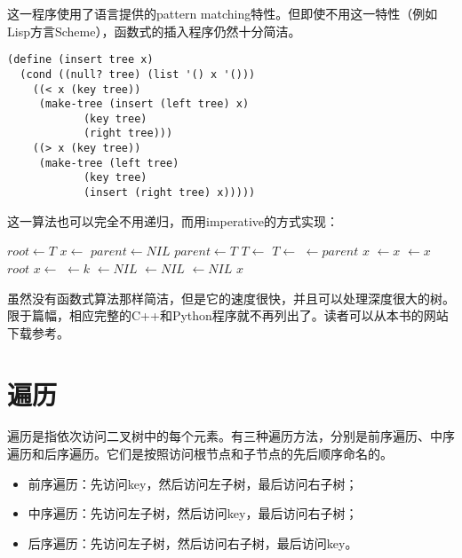 \documentclass[UTF8]{article}
\begin{document}
这一程序使用了语言提供的pattern matching特性。但即使不用这一特性（例如Lisp方言Scheme），函数式的插入程序仍然十分简洁。

\lstset{language=lisp}
\begin{lstlisting}
(define (insert tree x)
  (cond ((null? tree) (list '() x '()))
	((< x (key tree))
	 (make-tree (insert (left tree) x)
		    (key tree)
		    (right tree)))
	((> x (key tree))
	 (make-tree (left tree)
		    (key tree)
		    (insert (right tree) x)))))
\end{lstlisting}

这一算法也可以完全不用递归，而用imperative的方式实现：

\begin{algorithmic}[1]
  \State $root \gets T$
  \State $x \gets$ 
  \State $parent \gets NIL$
    \State $parent \gets T$
      \State $T \gets $ 
    \Else
      \State $T \gets $ 
    \EndIf
  \EndWhile
  \State {} $\gets parent$
   
    \State \Return $x$
    \State {} $\gets x$
  \Else
    \State {} $\gets x$
  \EndIf
  \State \Return $root$
\EndFunction
\Statex
{}
  \State $x \gets $ 
  \State {} $ \gets k$
  \State {} $ \gets NIL$
  \State {} $ \gets NIL$
  \State {} $ \gets NIL$
  \State \Return $x$
\EndFunction
\end{algorithmic}

虽然没有函数式算法那样简洁，但是它的速度很快，并且可以处理深度很大的树。限于篇幅，相应完整的C++和Python程序就不再列出了。读者可以从本书的网站下载参考。

\section{遍历}

遍历是指依次访问二叉树中的每个元素。有三种遍历方法，分别是前序遍历、中序遍历和后序遍历。它们是按照访问根节点和子节点的先后顺序命名的。

\begin{itemize}
\item 前序遍历：先访问key，然后访问左子树，最后访问右子树；
\item 中序遍历：先访问左子树，然后访问key，最后访问右子树；
\item 后序遍历：先访问左子树，然后访问右子树，最后访问key。
\end{itemize}
\end{document}
